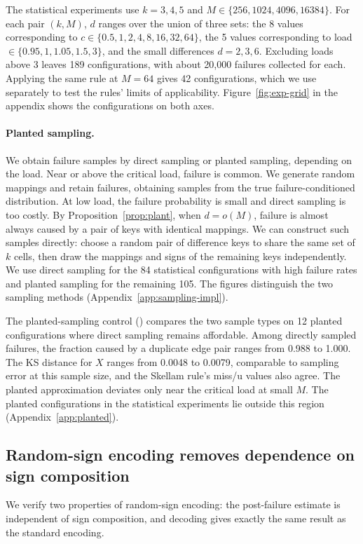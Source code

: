 The statistical experiments use $k=3,4,5$ and $M\in\{256,1024,4096,16384\}$. For each pair $(k,M)$, $d$ ranges over the union of three sets: the 8 values corresponding to $c\in\{0.5,1,2,4,8,16,32,64\}$, the 5 values corresponding to load $\in\{0.95,1,1.05,1.5,3\}$, and the small differences $d=2,3,6$. Excluding loads above 3 leaves 189 configurations, with about 20,000 failures collected for each. Applying the same rule at $M=64$ gives 42 configurations, which we use separately to test the rules' limits of applicability. Figure~\ref{fig:exp-grid} in the appendix shows the configurations on both axes.

\paragraph{Planted sampling.}
We obtain failure samples by direct sampling or planted sampling, depending on the load. Near or above the critical load, failure is common. We generate random mappings and retain failures, obtaining samples from the true failure-conditioned distribution. At low load, the failure probability is small and direct sampling is too costly. By Proposition~\ref{prop:plant}, when $d=o(M)$, failure is almost always caused by a pair of keys with identical mappings. We can construct such samples directly: choose a random pair of difference keys to share the same set of $k$ cells, then draw the mappings and signs of the remaining keys independently. We use direct sampling for the 84 statistical configurations with high failure rates and planted sampling for the remaining 105. The figures distinguish the two sampling methods (Appendix~\ref{app:sampling-impl}).

The planted-sampling control () compares the two sample types on 12 planted configurations where direct sampling remains affordable. Among directly sampled failures, the fraction caused by a duplicate edge pair ranges from 0.988 to 1.000. The KS distance for $X$ ranges from 0.0048 to 0.0079, comparable to sampling error at this sample size, and the Skellam rule's miss/u values also agree. The planted approximation deviates only near the critical load at small $M$. The planted configurations in the statistical experiments lie outside this region (Appendix~\ref{app:planted}).

\subsection{Random-sign encoding removes dependence on sign composition}\label{sec:exp-decode}
We verify two properties of random-sign encoding: the post-failure estimate is independent of sign composition, and decoding gives exactly the same result as the standard encoding.

